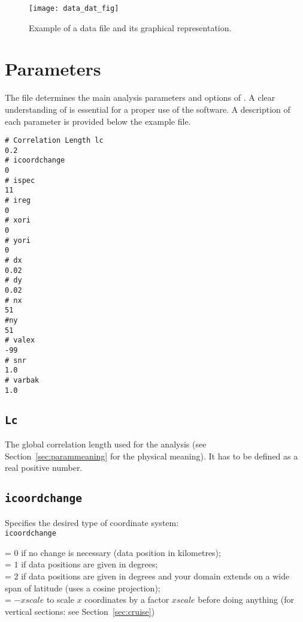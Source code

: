 \begin{figure}[H]
\centering
\texttt{[image: data\_dat\_fig]}
\caption{Example of a data file and its graphical representation.}
\end{figure}




\section{Parameters\label{sec:param.par}}

The file  determines the main analysis parameters and options of \diva. A clear understanding of is essential for a proper use of the software. A description of each parameter is provided below the example file.

\begin{exfile}[htpb]
\begin{verbatim}
# Correlation Length lc
0.2
# icoordchange
0
# ispec
11
# ireg
0
# xori
0
# yori
0
# dx
0.02
# dy
0.02
# nx
51
#ny
51
# valex
-99
# snr
1.0
# varbak
1.0
\end{verbatim}
\caption{param.par\label{paramfile}}
\end{exfile}


\subsection{\texttt{Lc}}

The global correlation length used for the analysis (see Section~\ref{sec:parammeaning} for the physical meaning). It has to be defined as a real positive number. 

\subsection{\texttt{icoordchange}\label{sec:icoord}}


Specifies the desired type of coordinate system:\\

\texttt{icoordchange} \begin{minipage}[t]{.7\textwidth} = $0$ if no change is necessary (data position in kilometres);\\
                                                        = $1$ if data positions are given in degrees;\\
                                                        = $2$ if data positions are given in degrees and your domain extends on a wide span of latitude                                                           (uses a cosine projection);\\
                                                        = $-xscale$ to scale $x$ coordinates by a factor $xscale$ before doing anything (for vertical sections: see Section~\ref{sec:cruise})
                      \end{minipage}
                      
